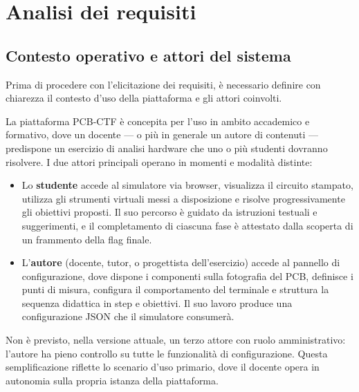 
\chapter{Analisi dei requisiti}
\label{ch:requisiti}

\section{Contesto operativo e attori del sistema}
\label{sec:contesto-attori}

Prima di procedere con l'elicitazione dei requisiti, è necessario definire con chiarezza il contesto d'uso della piattaforma e gli attori coinvolti.

La piattaforma PCB-CTF è concepita per l'uso in ambito accademico e formativo, dove un docente --- o più in generale un autore di contenuti --- predispone un esercizio di analisi hardware che uno o più studenti dovranno risolvere. I due attori principali operano in momenti e modalità distinte:

\begin{itemize}
  \item Lo \textbf{studente} accede al simulatore via browser, visualizza il circuito stampato, utilizza gli strumenti virtuali messi a disposizione e risolve progressivamente gli obiettivi proposti. Il suo percorso è guidato da istruzioni testuali e suggerimenti, e il completamento di ciascuna fase è attestato dalla scoperta di un frammento della flag finale.

  \item L'\textbf{autore} (docente, tutor, o progettista dell'esercizio) accede al pannello di configurazione, dove dispone i componenti sulla fotografia del PCB, definisce i punti di misura, configura il comportamento del terminale e struttura la sequenza didattica in step e obiettivi. Il suo lavoro produce una configurazione JSON che il simulatore consumerà.
\end{itemize}

Non è previsto, nella versione attuale, un terzo attore con ruolo amministrativo: l'autore ha pieno controllo su tutte le funzionalità di configurazione. Questa semplificazione riflette lo scenario d'uso primario, dove il docente opera in autonomia sulla propria istanza della piattaforma.


